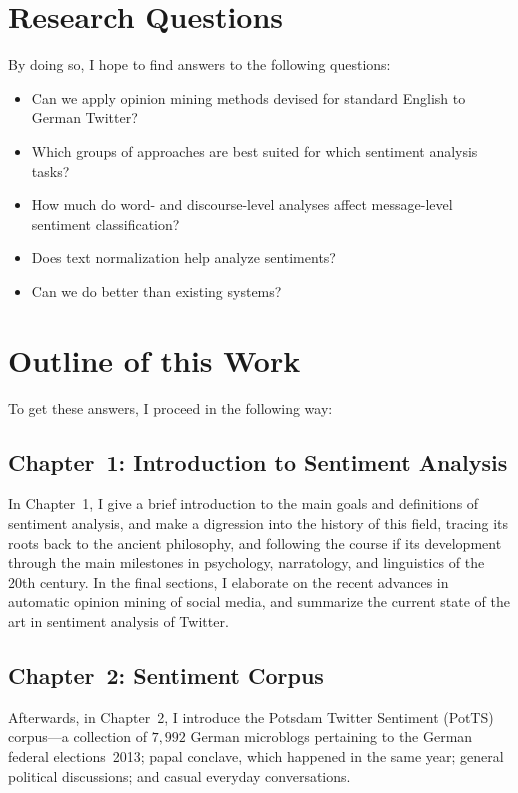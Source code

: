 \documentclass[11pt]{article}
\begin{document}
\section{Research Questions}

By doing so, I hope to find answers to the following questions:
\begin{itemize}
\item Can we apply opinion mining methods devised for standard English
  to German Twitter?
\item Which groups of approaches are best suited for which sentiment
  analysis tasks?
\item How much do word- and discourse-level analyses affect
  message-level sentiment classification?
\item Does text normalization help analyze sentiments?
\item Can we do better than existing systems?
\end{itemize}

\section{Outline of this Work}

To get these answers, I proceed in the following way:

\subsection{Chapter~1: Introduction to Sentiment Analysis}

In Chapter~1, I give a brief introduction to the main goals and
definitions of sentiment analysis, and make a digression into the
history of this field, tracing its roots back to the ancient
philosophy, and following the course if its development through the
main milestones in psychology, narratology, and linguistics of the
20th century.  In the final sections, I elaborate on the recent
advances in automatic opinion mining of social media, and summarize
the current state of the art in sentiment analysis of Twitter.

\subsection{Chapter~2: Sentiment Corpus}

Afterwards, in Chapter~2, I introduce the Potsdam Twitter Sentiment
(PotTS) corpus---a collection of $7,992$ German microblogs pertaining
to the German federal elections~2013; papal conclave, which happened
in the same year; general political discussions; and casual everyday
conversations.
\end{document}
